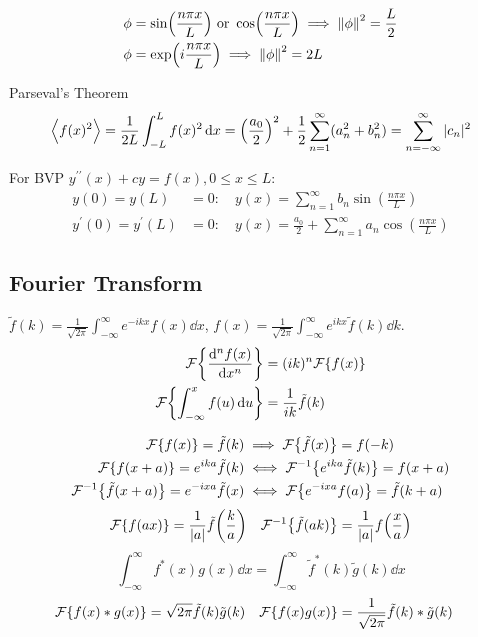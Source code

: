 \documentclass[8pt]{extarticle}
\newcommand{\Ft}[1]{ {\mathcal{F}\qty{#1}} }
\newcommand{\Fti}[1]{ {\mathcal{F}^{-1}\qty{#1}} }
\begin{document}
\begin{multicols*}{3}
\begin{align*}
    \phi &= \sin(\frac{n\pi x}{L}) \text{ or } \cos(\frac{n\pi x}{L}) \implies
    \norm{\phi}^2 = \frac{L}{2} \\
    \phi &= \exp(i\frac{n\pi x}{L}) \implies \norm{\phi}^2 = 2L
\end{align*}

Parseval's Theorem
\begin{equation*}
    \Big<f(x)^2\Big> = \frac{1}{2L}\int_{-L}^L f(x)^2 \dd{x} =
    \qty(\frac{a_0}{2})^2 + \frac{1}{2} \sum_{n=1}^\infty (a_n^2 + b_n^2) =
    \sum_{n=-\infty}^\infty |c_n|^2
\end{equation*}

For BVP $y^{\prime\prime}(x) + cy = f(x), 0 \leq x \leq L$:
\begin{align*}
    y(0)=y(L) &= 0: \quad y(x) = \sum_{n=1}^\infty b_n \sin(\frac{n \pi x}{L})\\
    y^\prime(0)=y^\prime(L) &= 0: \quad y(x) = \frac{a_0}{2} + \sum_{n=1}^\infty
    a_n \cos(\frac{n \pi x}{L})
\end{align*}

\subsection{Fourier Transform}
$\tilde f(k) = \frac{1}{\sqrt{2\pi}} \int_{-\infty}^\infty e^{-ikx}f(x)\dd{x}$,
$f(x) = \frac{1}{\sqrt{2\pi}}\int_{-\infty}^\infty e^{ikx}\tilde f(k)\dd{k}$.
\begin{align*}
    \mathcal{F}\qty{\dv[n]{f(x)}{x}} &= (ik)^n \mathcal{F}\qty{f(x)} \\
    \mathcal{F}\qty{\int_{-\infty}^x f(u) \dd{u}} &= \frac{1}{ik}\tilde f(k)
\end{align*}

\begin{align*}
    \Ft{f(x)} = \tilde f(k) &\implies \Ft{\tilde f(x)} = f(-k)\\
    \Ft{f(x+a)} = e^{ika}\tilde f(k) &\iff \Fti{e^{ika}\tilde f(k)} =
    f(x+a) \\
    \Fti{\tilde f(x+a)} = e^{-ixa}\tilde f(x) &\iff \Ft{e^{-ixa}f(a)}
    = \tilde f(k+a)
\end{align*}
\begin{align*}
    \Ft{f(ax)} &= \frac{1}{|a|}\tilde f\qty(\frac{k}{a}) &
    \Fti{\tilde f(ak)} = \frac{1}{|a|}f\qty(\frac{x}{a})
\end{align*}
\begin{equation*}
    \int_{-\infty}^{\infty} f^*(x)g(x) \dd{x} = \int_{-\infty}^{\infty} \tilde
    f^*(k)\tilde g(k) \dd{x}
\end{equation*}
\begin{align*}
    \Ft{f(x) * g(x)} &= \sqrt{2\pi}\tilde f(k) \tilde g(k) &
    \Ft{f(x)g(x)} &= \frac{1}{\sqrt{2\pi}} \tilde f(k) * \tilde g(k)
\end{align*}


\end{multicols*}
\end{document}
